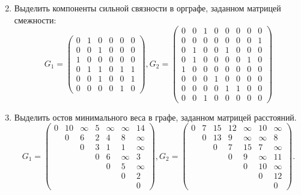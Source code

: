 \begin{enumerate}
\[    \]
    \item Выделить компоненты сильной связности в орграфе, заданном матрицей смежности:
    \[
        G_1=
        \begin{pmatrix}
            0&1&0&0&0&0\\
            0&0&1&0&0&0\\
            1&0&0&0&0&0\\
            0&1&1&0&1&1\\
            0&0&1&0&0&1\\
            0&0&0&0&1&0
        \end{pmatrix},
        G_2=
        \begin{pmatrix}
            0&0&1&0&0&0&0&0\\
            0&0&0&0&0&0&0&1\\
            0&1&0&0&1&0&0&0\\
            0&1&0&0&0&0&1&0\\
            1&0&0&0&0&0&0&0\\
            0&0&0&1&0&0&0&0\\
            0&0&0&0&1&1&0&0\\
            0&0&1&0&0&0&0&0
        \end{pmatrix}
    \]
    \item Выделить остов минимального веса в графе, заданном матрицей расстояний.
    \[
        G_1=
         \begin{pmatrix}
             0      &10     &\infty &5      &\infty &\infty &14     \\
                    &0      &6      &2      &4      &8      &\infty \\
                    &       &0      &3      &1      &1      &\infty \\
                    &       &       &0      &6      &\infty &3      \\
                    &       &       &       &0      &5      &\infty \\
                    &       &       &       &       &0      &2      \\
                    &       &       &       &       &       &0      
         \end{pmatrix},
        G_2=
         \begin{pmatrix}
             0      &7      &15     &12     &\infty &10     &\infty \\
                    &0      &13     &9      &\infty &\infty &8      \\
                    &       &0      &7      &15     &7      &\infty \\
                    &       &       &0      &9      &\infty &11     \\
                    &       &       &       &0      &10     &\infty \\
                    &       &       &       &       &0      &12     \\
                    &       &       &       &       &       &0      
         \end{pmatrix}.
    \]
    

\end{enumerate}
